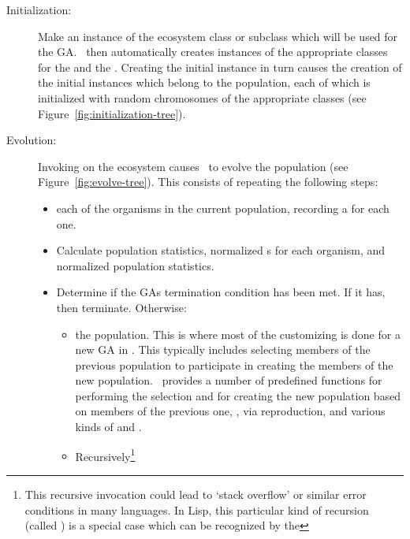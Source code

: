 {\samepage
\begin{description}
  \item[Initialization:] Make an instance of the ecosystem class or 
  subclass which will be used for the GA.  \Geco\ then automatically
  creates instances of the appropriate classes for the 
  and the .  
  Creating the initial  instance in turn causes the creation of 
  the initial  instances which belong to the population, each of 
  which is initialized with random chromosomes of the appropriate classes
  (see Figure~\ref{fig:initialization-tree}).
  \nopagebreak
  \item[Evolution:] Invoking  on the ecosystem causes \geco\ to 
  evolve the population (see Figure~\ref{fig:evolve-tree}).
  This consists of repeating the following steps:
  \nopagebreak
  \begin{itemize}
    \nopagebreak
    \item {} each of the organisms in the current population, recording 
    a  for each one.
    \item Calculate population statistics, normalized s
    for each organism, and normalized population statistics.
    \nopagebreak
    \item Determine if the GAs termination condition has been met.  If 
    it has, then terminate.  Otherwise:
    \nopagebreak
    \begin{itemize}
      \nopagebreak
      \item {} the population.  This is where most of the 
      customizing is done for a new GA in \geco.  This typically includes 
      selecting members of the previous population to participate in 
      creating the members of the new population.  \Geco\ provides a number 
      of predefined functions for performing the selection and for 
      creating the new population based on members of the previous one, 
      \eg, via reproduction, and various kinds of
       and .
      \nopagebreak
      \item Recursively\footnote{This recursive invocation could lead to 
                        `stack overflow' or similar error conditions in
                        many languages.  In Lisp, this particular kind
                        of recursion (called )
                        is a special case which can be recognized by the
}
\end{itemize}
\end{itemize}
\end{description}}
